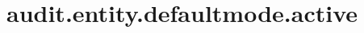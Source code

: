 \section{audit.entity.defaultmode.active}
\label{configuration:AuditEntityDefaultmodeActive}
\AvailableInJavaOnly{\TODO}
